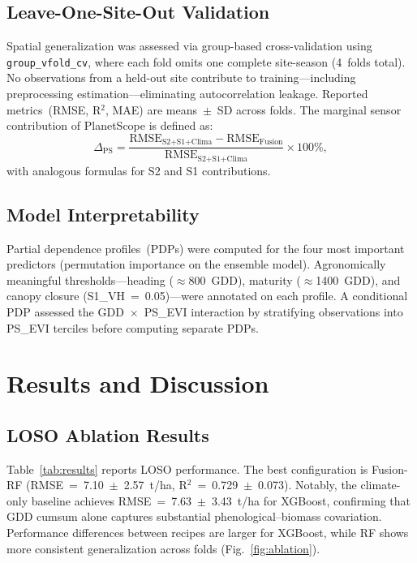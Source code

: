 \documentclass[lettersize,journal]{IEEEtran}
\begin{document}
\subsection{Leave-One-Site-Out Validation}

Spatial generalization was assessed via group-based cross-validation using
\texttt{group\_vfold\_cv}, where each fold omits one complete site-season
(4~folds total). No observations from a held-out site contribute to
training---including preprocessing estimation---eliminating autocorrelation
leakage. Reported metrics~(RMSE, R$^2$, MAE) are means~$\pm$~SD across
folds. The marginal sensor contribution of PlanetScope is defined as:
%
\begin{equation}
\Delta_{\text{PS}} = \frac{\text{RMSE}_{\text{S2+S1+Clima}} -
  \text{RMSE}_{\text{Fusion}}}{\text{RMSE}_{\text{S2+S1+Clima}}}
  \times 100\%,
\label{eq:delta}
\end{equation}
%
with analogous formulas for S2 and S1 contributions.

\subsection{Model Interpretability}

Partial dependence profiles~(PDPs) were computed for the four most important
predictors (permutation importance on the ensemble model). Agronomically
meaningful thresholds---heading ($\approx$800~GDD), maturity
($\approx$1400~GDD), and canopy closure (S1\_VH~=~0.05)---were annotated on
each profile. A conditional PDP assessed the GDD~$\times$~PS\_EVI interaction
by stratifying observations into PS\_EVI terciles before computing separate
PDPs.

\section{Results and Discussion}

\subsection{LOSO Ablation Results}

Table~\ref{tab:results} reports LOSO performance. The best configuration is
Fusion-RF (RMSE~=~7.10~$\pm$~2.57~t/ha, R$^2$~=~0.729~$\pm$~0.073).
Notably, the climate-only baseline achieves RMSE~=~7.63~$\pm$~3.43~t/ha
for XGBoost, confirming that GDD cumsum alone captures substantial
phenological--biomass covariation. Performance differences between recipes
are larger for XGBoost, while RF shows more consistent generalization across
folds (Fig.~\ref{fig:ablation}).
\end{document}
